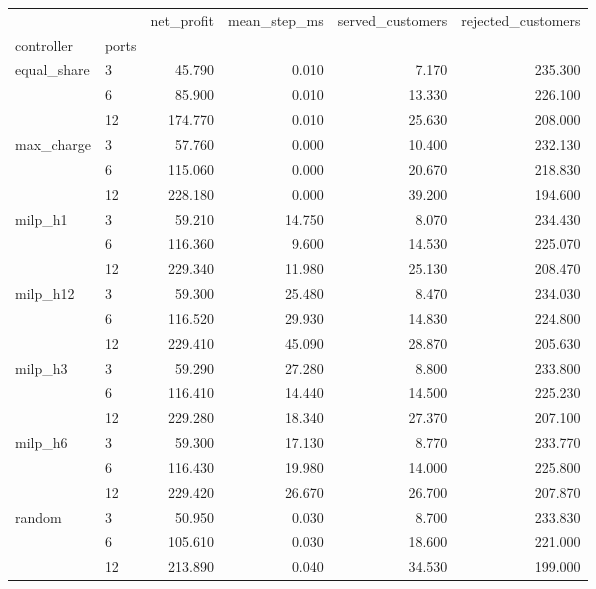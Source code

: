 \begin{tabular}{llrrrr}
\toprule
 &  & net_profit & mean_step_ms & served_customers & rejected_customers \\
controller & ports &  &  &  &  \\
\midrule
\multirow[t]{3}{*}{equal_share} & 3 & 45.790 & 0.010 & 7.170 & 235.300 \\
 & 6 & 85.900 & 0.010 & 13.330 & 226.100 \\
 & 12 & 174.770 & 0.010 & 25.630 & 208.000 \\
\cline{1-6}
\multirow[t]{3}{*}{max_charge} & 3 & 57.760 & 0.000 & 10.400 & 232.130 \\
 & 6 & 115.060 & 0.000 & 20.670 & 218.830 \\
 & 12 & 228.180 & 0.000 & 39.200 & 194.600 \\
\cline{1-6}
\multirow[t]{3}{*}{milp_h1} & 3 & 59.210 & 14.750 & 8.070 & 234.430 \\
 & 6 & 116.360 & 9.600 & 14.530 & 225.070 \\
 & 12 & 229.340 & 11.980 & 25.130 & 208.470 \\
\cline{1-6}
\multirow[t]{3}{*}{milp_h12} & 3 & 59.300 & 25.480 & 8.470 & 234.030 \\
 & 6 & 116.520 & 29.930 & 14.830 & 224.800 \\
 & 12 & 229.410 & 45.090 & 28.870 & 205.630 \\
\cline{1-6}
\multirow[t]{3}{*}{milp_h3} & 3 & 59.290 & 27.280 & 8.800 & 233.800 \\
 & 6 & 116.410 & 14.440 & 14.500 & 225.230 \\
 & 12 & 229.280 & 18.340 & 27.370 & 207.100 \\
\cline{1-6}
\multirow[t]{3}{*}{milp_h6} & 3 & 59.300 & 17.130 & 8.770 & 233.770 \\
 & 6 & 116.430 & 19.980 & 14.000 & 225.800 \\
 & 12 & 229.420 & 26.670 & 26.700 & 207.870 \\
\cline{1-6}
\multirow[t]{3}{*}{random} & 3 & 50.950 & 0.030 & 8.700 & 233.830 \\
 & 6 & 105.610 & 0.030 & 18.600 & 221.000 \\
 & 12 & 213.890 & 0.040 & 34.530 & 199.000 \\
\cline{1-6}
\bottomrule
\end{tabular}
